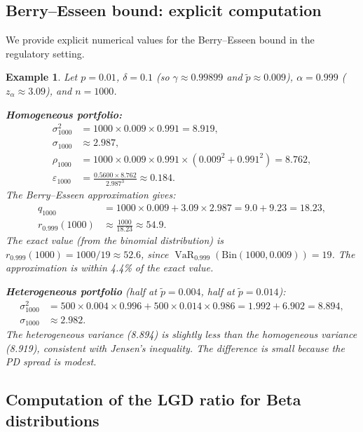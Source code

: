 \documentclass[11pt]{article}
\newtheorem{example}[theorem]{Example}
\theoremstyle{definition}
\newcommand{\VaR}{\operatorname{VaR}}
\newcommand{\1}{\mathbf{1}}
\begin{document}
\subsection{Berry--Esseen bound: explicit computation}\label{app:berry_esseen}

We provide explicit numerical values for the Berry--Esseen bound in the regulatory setting.

\begin{example}\label{ex:be_explicit}
Let $p = 0.01$, $\delta = 0.1$ (so $\gamma \approx 0.99899$ and $\tilde{p} \approx 0.009$), $\alpha = 0.999$ ($z_\alpha \approx 3.09$), and $n = 1000$.

\textbf{Homogeneous portfolio:}
\begin{align*}
  \sigma_{1000}^2 &= 1000 \times 0.009 \times 0.991 = 8.919, \\
  \sigma_{1000} &\approx 2.987, \\
  \rho_{1000} &= 1000 \times 0.009 \times 0.991 \times (0.009^2 + 0.991^2) = 8.762, \\
  \varepsilon_{1000} &= \frac{0.5600 \times 8.762}{2.987^3} \approx 0.184.
\end{align*}
The Berry--Esseen approximation gives:
\begin{align*}
  q_{1000} &= 1000 \times 0.009 + 3.09 \times 2.987 = 9.0 + 9.23 = 18.23, \\
  r_{0.999}(1000) &\approx \frac{1000}{18.23} \approx 54.9.
\end{align*}
The exact value (from the binomial distribution) is $r_{0.999}(1000) = 1000/19 \approx 52.6$, since $\VaR_{0.999}(\mathrm{Bin}(1000, 0.009)) = 19$. The approximation is within 4.4\% of the exact value.

\textbf{Heterogeneous portfolio} (half at $\tilde{p} = 0.004$, half at $\tilde{p} = 0.014$):
\begin{align*}
  \sigma_{1000}^2 &= 500 \times 0.004 \times 0.996 + 500 \times 0.014 \times 0.986 = 1.992 + 6.902 = 8.894, \\
  \sigma_{1000} &\approx 2.982.
\end{align*}
The heterogeneous variance (8.894) is slightly less than the homogeneous variance (8.919), consistent with Jensen's inequality. The difference is small because the PD spread is modest.
\end{example}

\subsection{Computation of the LGD ratio for Beta distributions}\label{app:beta_lgd}
\end{document}
